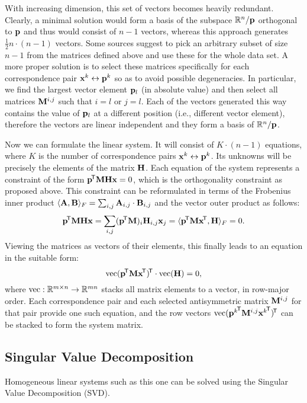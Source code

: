 With increasing dimension, this set of vectors becomes heavily redundant.
Clearly, a minimal solution would form a basis of the subspace $\mathbb{R}^n / \mathbf{p}$ orthogonal to $\mathbf{p}$ and thus would consist of $n - 1$ vectors, whereas this approach generates $\frac {1} {2} n \cdot (n - 1)$ vectors.
Some sources\cite{MVG} suggest to pick an arbitrary subset of size $n - 1$ from the matrices defined above and use these for the whole data set.
A more proper solution is to select these matrices specifically for each correspondence pair $\mathbf{x}^k \leftrightarrow \mathbf{p}^k$ so as to avoid possible degeneracies.
In particular, we find the largest vector element $\mathbf{p}_l$ (in absolute value) and then select all matrices $\mathbf{M}^{i, j}$ such that $i = l$ or $j = l$.
Each of the vectors generated this way contains the value of $\mathbf{p}_l$ at a different position (i.e., different vector element), therefore the vectors are linear independent and they form a basis of $\mathbb{R}^n / \mathbf{p}$.

Now we can formulate the linear system.
It will consist of $K \cdot (n - 1)$ equations, where $K$ is the number of correspondence pairs $\mathbf{x}^k \leftrightarrow \mathbf{p}^k$.
Its unknowns will be precisely the elements of the matrix $\mathbf{H}$.
Each equation of the system represents a constraint of the form $\mathbf{p}^{\!\mathsf{T}} \mathbf{M} \mathbf{H} \mathbf{x} = 0$, which is the orthogonality constraint as proposed above.
This constraint can be reformulated in terms of the Frobenius inner product $\langle \mathbf{A}, \mathbf{B} \rangle_F = \sum_{i, j} \mathbf{A}_{i, j} \cdot \mathbf{B}_{i, j}$ and the vector outer product as follows:
$$\mathbf{p}^{\!\mathsf{T}} \mathbf{M} \mathbf{H} \mathbf{x} = \sum_{i, j} (\mathbf{p}^{\!\mathsf{T}} \mathbf{M})_i \mathbf{H}_{i, j} \mathbf{x}_j = \langle \mathbf{p}^{\!\mathsf{T}} \mathbf{M} \mathbf{x}^{\!\mathsf{T}}, \mathbf{H} \rangle_F = 0.$$
Viewing the matrices as vectors of their elements, this finally leads to an equation in the suitable form:
$$\textrm{vec} (\mathbf{p}^{\!\mathsf{T}} \mathbf{M} \mathbf{x}^{\!\mathsf{T}})^{\!\mathsf{T}} \cdot \textrm{vec}(\mathbf{H}) = 0,$$
where $\textrm{vec} : \mathbb{R}^{m \times n} \rightarrow \mathbb{R}^{mn}$ stacks all matrix elements to a vector, in row-major order.
Each correspondence pair and each selected antisymmetric matrix $\mathbf{M}^{i, j}$ for that pair provide one such equation, and the row vectors $\textrm{vec} ({\mathbf{p}^k}^{\!\mathsf{T}} \mathbf{M}^{i, j} {\mathbf{x}^k}^{\!\mathsf{T}})^{\!\mathsf{T}}$ can be stacked to form the system matrix.

\subsection{Singular Value Decomposition}

Homogeneous linear systems such as this one can be solved using the Singular Value Decomposition (SVD).


